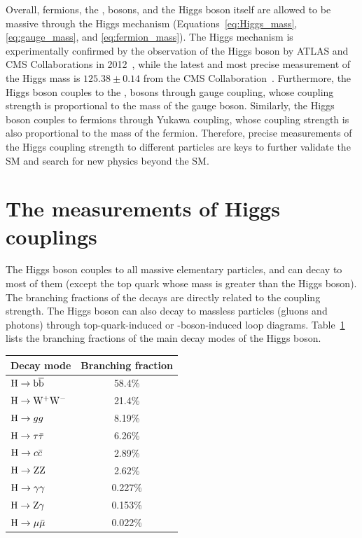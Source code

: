 Overall, fermions, the \PW, \PZ bosons, and the Higgs boson itself are allowed to be massive through the Higgs mechanism (Equations~\ref{eq:Higgs_mass}, \ref{eq:gauge_mass}, and \ref{eq:fermion_mass}).
The Higgs mechanism is experimentally confirmed by the observation of the Higgs boson by ATLAS and CMS Collaborations in 2012~\cite{Aad:2012tfa, Chatrchyan:2012xdj, Chatrchyan:2013lba},
while the latest and most precise measurement of the Higgs mass is $125.38 \pm 0.14$ \GeV from the CMS Collaboration~\cite{2020135425}.  
Furthermore, the Higgs boson couples to the \PW, \PZ bosons through gauge coupling, whose coupling strength is proportional to the mass of the gauge boson.
Similarly, the Higgs boson couples to fermions through Yukawa coupling, whose coupling strength is also proportional to the mass of the fermion.
Therefore, precise measurements of the Higgs coupling strength to different particles are keys to further validate the SM and search for new physics beyond the SM.


\section{The measurements of Higgs couplings}

The Higgs boson couples to all massive elementary particles, and can decay to most of them (except the top quark whose mass is greater than the Higgs boson).
The branching fractions of the decays are directly related to the coupling strength.
The Higgs boson can also decay to massless particles (gluons and photons) through top-quark-induced or \PW-boson-induced loop diagrams.
Table~\ref{tab:higgs_BR} lists the branching fractions of the main decay modes of the Higgs boson.

\begin{table}[!htb]
  \centering
  \captionsetup{justification=justified}
  \begin{tabular}{lc}
    \hline
    Decay mode                 &  Branching fraction \\
    \hline
    $\mathrm{H} \to \mathrm{b}\overline{\mathrm{b}}$        &  58.4\% \\
    $\mathrm{H} \to \mathrm{W}^{+}\mathrm{W}^{-}$   &  21.4\% \\
    $\mathrm{H} \to gg$               &  8.19\% \\
    $\mathrm{H} \to \tau\bar{\tau}$   &  6.26\% \\
    $\mathrm{H} \to c\bar{c}$         &  2.89\% \\
    $\mathrm{H} \to \mathrm{Z}\mathrm{Z}$           &  2.62\% \\
    $\mathrm{H} \to \gamma\gamma$     &  0.227\% \\
    $\mathrm{H} \to \mathrm{Z}\gamma$        &  0.153\% \\
    $\mathrm{H} \to \mu\bar{\mu}$     &  0.022\% \\
    \hline
  \end{tabular}
  \label{tab:higgs_BR}
\end{table}

